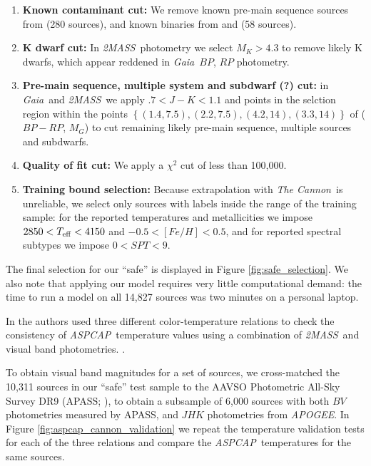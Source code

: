 \documentclass[modern]{aastex62}
\newcommand{\apogee}{\textsl{APOGEE}}
\newcommand{\thecannon}{\textsl{The Cannon}}
\newcommand{\aspcap}{\textsl{ASPCAP}}
\newcommand{\gaia}{\textsl{Gaia}}
\newcommand{\zmass}{\textsl{2MASS}}
\begin{document}
\begin{enumerate}
\item \textbf{Known contaminant cut:} We remove known pre-main sequence sources from \citealt{Cottaar:2014} (280 sources), and known binaries from \citealt{ElBadry:2018} and \citealt{Skinner:2018} (58 sources).

\item \textbf{K dwarf cut:} In \zmass\ photometry we select $M_K > 4.3$ to remove likely K dwarfs, which appear reddened in \gaia\ $BP$, $RP$ photometry.

\item \textbf{Pre-main sequence, multiple system and subdwarf (?) cut:} in \gaia\ and \zmass\ we apply $.7<J-K<1.1$ and points in the selction region within the points $\left\{ (1.4, 7.5), (2.2, 7.5), (4.2, 14), (3.3, 14) \right\}$ of ($BP-RP$, $M_G$) to cut remaining likely pre-main sequence, multiple sources and subdwarfs.

\item \textbf{Quality of fit cut:} We apply a $\chi^2$ cut of less than 100,000.

\item \textbf{Training bound selection:} Because extrapolation with \thecannon\ is unreliable, we select only sources with labels inside the range of the training sample: for the reported temperatures and metallicities we impose $2850<T_{\rm eff}<4150$ and $-0.5<[Fe/H]<0.5$, and for reported spectral subtypes we impose $0<SPT<9$.
\end{enumerate}

The final selection for our ``safe'' is displayed in Figure \ref{fig:safe_selection}. We also note that applying our model requires very little computational demand: the time to run a model on all 14,827 sources was two minutes on a personal laptop.

In \citealt{Schmidt:2016} the authors used three different color-temperature relations to check the consistency of \aspcap\ temperature values using a combination of \zmass\ and visual band photometries. \color{black}. 

To obtain visual band magnitudes for a set of sources, we cross-matched the 10,311 sources in our ``safe'' test sample to the AAVSO Photometric All-Sky Survey DR9 (APASS; \citealt{Henden:2016}), to obtain a subsample of 6,000 sources with both $BV$ photometries measured by APASS, and $JHK$ photometries from \apogee. In Figure \ref{fig:aspcap_cannon_validation} we repeat the temperature validation tests for each of the three relations and compare the \aspcap\ temperatures for the same sources. \color{gcolor}{Comments about validation results and the uncertainty of our Cannon temperatures...}\color{black}
\end{document}
